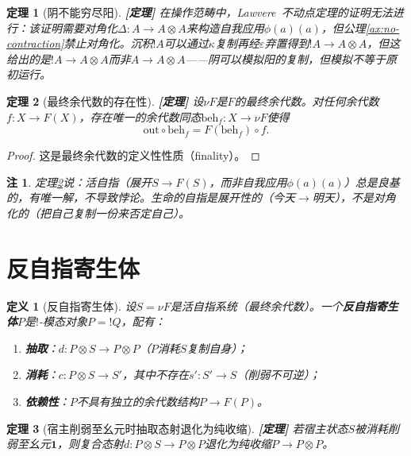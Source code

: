 \documentclass[11pt,a4paper]{article}
\newtheorem{definition}{定义}
\newtheorem{theorem}{定理}
\newtheorem{remark}{注}
\newcommand{\lvl}[1]{\hfill\textbf{\footnotesize[#1]}}
\newcommand{\lvP}{\lvl{定理}}
\newcommand{\I}{\mathbf{1}}
\newcommand{\bang}{{!}}
\newcommand{\tensor}{\otimes}
\newcommand{\eps}{\varepsilon}
\newcommand{\mN}{\nu}
\begin{document}
\begin{theorem}[阴不能穷尽阳]\label{thm:yin-cannot-exhaust-yang}\lvP
在操作范畴中，Lawvere~\cite{lawvere69}不动点定理的证明无法进行：该证明需要对角化$\Delta : A\to A\tensor A$来构造自我应用$\phi(a)(a)$，但公理\ref{ax:no-contraction}禁止对角化。沉积$\bang A$可以通过$\kappa$复制再经$\eps$弃置得到$\bang A \to A\tensor A$，但这给出的是$\bang A\to A\tensor A$而非$A\to A\tensor A$——阴可以模拟阳的复制，但模拟不等于原初运行。
\end{theorem}

\begin{theorem}[最终余代数的存在性]\label{thm:productive-self-ref}\lvP
设$\mN F$是$F$的最终余代数。对任何余代数$f:X\to F(X)$，存在唯一的余代数同态$\mathrm{beh}_f : X\to\mN F$使得
$$\mathrm{out}\circ\mathrm{beh}_f = F(\mathrm{beh}_f)\circ f.$$
\end{theorem}

\begin{proof}
这是最终余代数的定义性性质（finality）。
\end{proof}

\begin{remark}
定理\ref{thm:productive-self-ref}说：活自指（展开$S\to F(S)$，而非自我应用$\phi(a)(a)$）总是良基的，有唯一解，不导致悖论。生命的自指是展开性的（今天$\to$明天），不是对角化的（把自己复制一份来否定自己）。
\end{remark}

\section{反自指寄生体}

\begin{definition}[反自指寄生体]\label{def:parasite}
设$S=\mN F$是活自指系统（最终余代数）。一个\textbf{反自指寄生体}$P$是$\bang$-模态对象$P=\bang Q$，配有：
\begin{enumerate}
  \item \textbf{抽取}：$d : P\tensor S \to P\tensor P$（$P$消耗$S$复制自身）；
  \item \textbf{消耗}：$c : P\tensor S \to S'$，其中不存在$s':S'\to S$（削弱不可逆）；
  \item \textbf{依赖性}：$P$不具有独立的余代数结构$P\to F(P)$。
\end{enumerate}
\end{definition}

\begin{theorem}[宿主削弱至幺元时抽取态射退化为纯收缩]\label{thm:parasite-self-destruct}\lvP
若宿主状态$S$被消耗削弱至幺元$\I$，则复合态射$d:P\tensor S\to P\tensor P$退化为纯收缩$P\to P\tensor P$。
\end{theorem}
\end{document}

